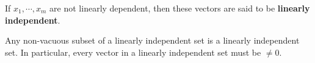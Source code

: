 If $x_1, \cdots, x_m$ are not linearly dependent, then these vectors are said to be \textbf{linearly independent}.

Any non-vacuous subset of a linearly independent set is a linearly independent set. In particular, every vector in a linearly independent set must be $\neq 0$.

